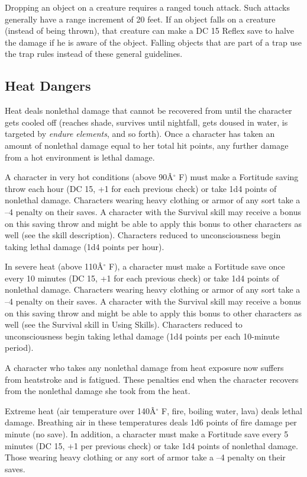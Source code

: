 Dropping an object on a creature requires a ranged touch attack. Such attacks generally have a range increment of 20 feet. If an object falls on a creature (instead of being thrown), that creature can make a DC 15 Reflex save to halve the damage if he is aware of the object. Falling objects that are part of a trap use the trap rules instead of these general guidelines.
								
\subsection{Heat Dangers}

				
Heat deals nonlethal damage that cannot be recovered from until the character gets cooled off (reaches shade, survives until nightfall, gets doused in water, is targeted by \textit{endure elements}, and so forth). Once a character has taken an amount of nonlethal damage equal to her total hit points, any further damage from a hot environment is lethal damage.
				
A character in very hot conditions (above 90\^A\mbox{${}^\circ$} F) must make a Fortitude saving throw each hour (DC 15, +1 for each previous check) or take 1d4 points of nonlethal damage. Characters wearing heavy clothing or armor of any sort take a --4 penalty on their saves. A character with the Survival skill may receive a bonus on this saving throw and might be able to apply this bonus to other characters as well (see the skill description). Characters reduced to unconsciousness begin taking lethal damage (1d4 points per hour).
				
In severe heat (above 110\^A\mbox{${}^\circ$} F), a character must make a Fortitude save once every 10 minutes (DC 15, +1 for each previous check) or take 1d4 points of nonlethal damage. Characters wearing heavy clothing or armor of any sort take a --4 penalty on their saves. A character with the Survival skill may receive a bonus on this saving throw and might be able to apply this bonus to other characters as well (see the Survival skill in Using Skills). Characters reduced to unconsciousness begin taking lethal damage (1d4 points per each 10-minute period).
				
A character who takes any nonlethal damage from heat exposure now suffers from heatstroke and is fatigued. These penalties end when the character recovers from the nonlethal damage she took from the heat.
				
Extreme heat (air temperature over 140\^A\mbox{${}^\circ$} F, fire, boiling water, lava) deals lethal damage. Breathing air in these temperatures deals 1d6 points of fire damage per minute (no save). In addition, a character must make a Fortitude save every 5 minutes (DC 15, +1 per previous check) or take 1d4 points of nonlethal damage. Those wearing heavy clothing or any sort of armor take a --4 penalty on their saves.
				
